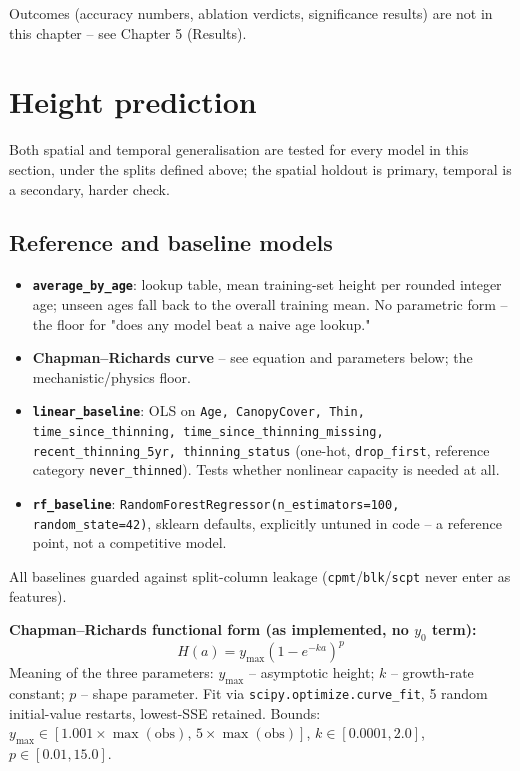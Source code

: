 \documentclass[11pt,a4paper]{report}
\begin{document}
Outcomes (accuracy numbers, ablation verdicts, significance results) are not in this chapter --
see Chapter 5 (Results).

\section{Height prediction}

Both spatial and temporal generalisation are tested for every model in this section, under the
splits defined above; the spatial holdout is primary, temporal is a secondary, harder check.

\subsection*{Reference and baseline models}

\begin{itemize}
\setlength\itemsep{0pt}
\item \textbf{\texttt{average\_by\_age}}: lookup table, mean training-set height per rounded
integer age; unseen ages fall back to the overall training mean. No parametric form -- the floor
for "does any model beat a naive age lookup."
\item \textbf{Chapman--Richards curve} -- see equation and parameters below; the mechanistic/physics
floor.
\item \textbf{\texttt{linear\_baseline}}: OLS on \texttt{Age, CanopyCover, Thin,
time\_since\_thinning, time\_since\_thinning\_missing, recent\_thinning\_5yr, thinning\_status}
(one-hot, \texttt{drop\_first}, reference category \texttt{never\_thinned}). Tests whether
nonlinear capacity is needed at all.
\item \textbf{\texttt{rf\_baseline}}: \texttt{RandomForestRegressor(n\_estimators=100,
random\_state=42)}, sklearn defaults, explicitly untuned in code -- a reference point, not a
competitive model.
\end{itemize}

All baselines guarded against split-column leakage (\texttt{cpmt}/\texttt{blk}/\texttt{scpt}
never enter as features).

\textbf{Chapman--Richards functional form (as implemented, no $y_0$ term):}
\[
H(a) = y_{\max}\left(1 - e^{-ka}\right)^p
\]
Meaning of the three parameters: $y_{\max}$ -- asymptotic height; $k$ -- growth-rate constant;
$p$ -- shape parameter. Fit via \texttt{scipy.optimize.curve\_fit}, 5 random initial-value
restarts, lowest-SSE retained. Bounds: $y_{\max}\in[1.001\times\max(\text{obs}),\,5\times\max(\text{obs})]$,
$k\in[0.0001, 2.0]$, $p\in[0.01, 15.0]$.
\end{document}
